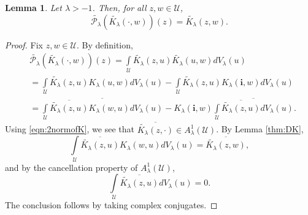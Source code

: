 \documentclass{amsart}
\newtheorem{lemma}[theorem]{Lemma}
\numberwithin{equation}{section}
\newcommand{\calU}{\mathcal{U}}
\newcommand{\bfi}{\mathbf{i}}
\begin{document}
\begin{lemma}\label{lem:Kreproduce}
Let $\lambda>-1$. Then, for all $z,w\in\calU$,
\[
\widetilde{\mathcal{P}_\lambda}(\widetilde{K_\lambda}(\cdot,w))(z)=\widetilde{K_\lambda}(z,w).
\]
\end{lemma}

\begin{proof}
Fix $z,w\in \calU$. By definition,
\begin{align*}
&\widetilde{\mathcal{P}_\lambda}(\widetilde{K_\lambda}(\cdot,w))(z)
=\int\limits_{\calU} \widetilde{K_{\lambda}} (z,u) \widetilde{K_{\lambda}}(u,w) dV_\lambda(u)\\
&=\int\limits_{\calU} \widetilde{K_{\lambda}} (z,u) K_{\lambda}(u,w) dV_\lambda(u)
-\int\limits_{\calU} \widetilde{K_{\lambda}} (z,u) K_{\lambda}(\bfi,w) dV_\lambda(u)\\
&=\overline{\int\limits_{\calU} \overline{\widetilde{K_{\lambda}} (z,u)} K_{\lambda}(w,u) dV_\lambda(u)}
-K_{\lambda}(\bfi,w) \overline{\int\limits_{\calU} \overline{\widetilde{K_{\lambda}} (z,u)} dV_\lambda(u)}.
\end{align*}
Using \eqref{eqn:2normofK}, we see that $\overline{\widetilde{K_\lambda}(z,\cdot)} \in A_\lambda^1(\calU)$. 
By Lemma \ref{thm:DK},
\[
\int\limits_{\calU} \overline{\widetilde{K_{\lambda}} (z,u)} K_{\lambda}(w,u) dV_\lambda(u)
= \overline{\widetilde{K_\lambda}(z,w)},
\]
and by the cancellation property of $A_\lambda^1(\calU)$,
\[
\int\limits_{\calU} \overline{\widetilde{K_{\lambda}} (z,u)} dV_\lambda(u)=0.
\]
The conclusion follows by taking complex conjugates.
\end{proof}
\end{document}
